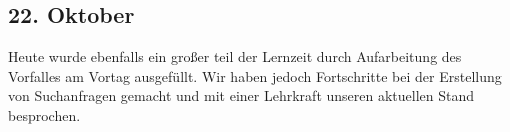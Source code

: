 \subsection{22. Oktober}
Heute wurde ebenfalls ein großer teil der Lernzeit durch Aufarbeitung des Vorfalles am Vortag ausgefüllt. Wir haben jedoch Fortschritte bei der Erstellung von Suchanfragen gemacht und mit einer Lehrkraft unseren aktuellen Stand besprochen.